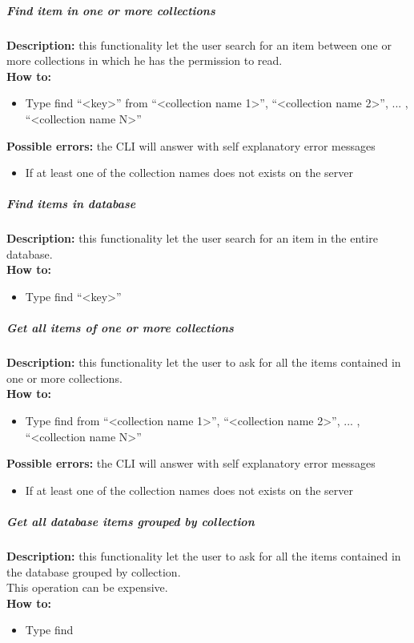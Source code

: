 \documentclass{scalatekids-article}
\begin{document}
\subparagraph{Find item in one or more collections}
\textbf{Description:} this functionality let the user search for an item between one or more collections in which he has the permission to read.\\
\textbf{How to:} 
\begin{itemize}
	\item Type find ``<key>'' from ``<collection name 1>'', ``<collection name 2>'', ... , ``<collection name N>''
\end{itemize}
\textbf{Possible errors:} the CLI will answer with self explanatory error messages 
\begin{itemize}
	\item If at least one of the collection names does not exists on the server
\end{itemize}

\subparagraph{Find items in database}
\textbf{Description:} this functionality let the user search for an item in the entire database.\\
\textbf{How to:} 
\begin{itemize}
	\item Type find ``<key>''
\end{itemize}

\subparagraph{Get all items of one or more collections}
\textbf{Description:} this functionality let the user to ask for all the items contained in one or more collections.\\
\textbf{How to:} 
\begin{itemize}
	\item Type find from ``<collection name 1>'', ``<collection name 2>'', ... , ``<collection name N>''
\end{itemize}
\textbf{Possible errors:} the CLI will answer with self explanatory error messages 
\begin{itemize}
	\item If at least one of the collection names does not exists on the server
\end{itemize}

\subparagraph{Get all database items grouped by collection}
\textbf{Description:} this functionality let the user to ask for all the items contained in the database grouped by collection.\\
This operation can be expensive.\\
\textbf{How to:} 
\begin{itemize}
	\item Type find
\end{itemize}
\end{document}
